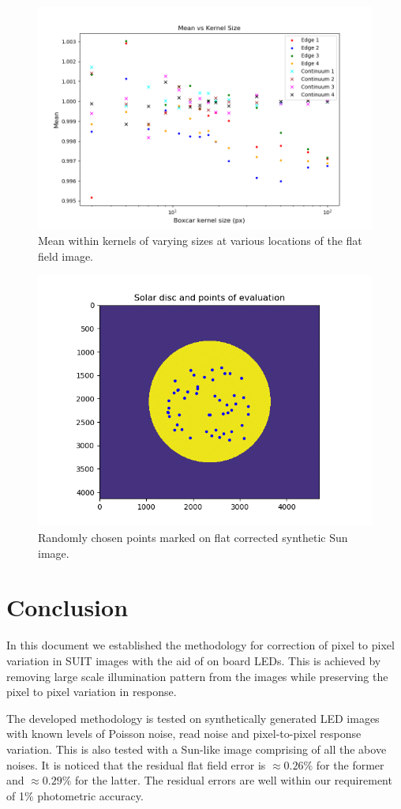 \documentclass[11pt,a4paper]{article}
\begin{document}
	
	\begin{figure}
		\centering
		\includegraphics[width=0.8\linewidth]{pics/synth_Mean.png}
		\caption{Mean within kernels of varying sizes at various locations of the flat field image.}
		\label{fig:synth_mean}
	\end{figure}

	\begin{figure}
		\centering
		\includegraphics[width=0.7\linewidth]{pics/sun_photometry}
		\caption{Randomly chosen points marked on flat corrected synthetic Sun image.}
		\label{fig:sunphotometry}
	\end{figure}
	

	\section{Conclusion}
		In this document we established the methodology for correction of pixel to pixel variation in SUIT images with the aid of on board LEDs. This is achieved by removing large scale illumination pattern from the images while preserving the pixel to pixel variation in response. 
		
		The developed methodology is tested on synthetically generated LED images with known levels of Poisson noise, read noise and pixel-to-pixel response variation. This is also tested with a Sun-like image comprising of all the above noises. It is noticed that the residual flat field error is $\approx 0.26\%$ for the former and $\approx 0.29 \%$ for the latter. The residual errors are well within our requirement of 1\% photometric accuracy.
		
\end{document}
